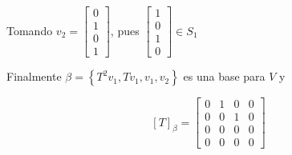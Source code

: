 \documentclass[10pt,a4paper]{article}
\begin{document}
Tomando $v_{2} = 
\begin{bmatrix}
0\\
1\\
0\\
1
\end{bmatrix}$, pues 
$\begin{bmatrix}
1\\
0\\
1\\
0
\end{bmatrix}\in S_{1}$

Finalmente $\beta = \left\{T^{2}v_{1}, Tv_{1}, v_{1}, v_{2}\right\}$ es una base para $V$ y 

$$[T]_{\beta} = 
\begin{bmatrix}
	0	&	1	&	0	&	0\\
	0	&	0	&	1	&	0\\
	0	&	0	&	0	&	0\\
	0	&	0	&	0	&	0
\end{bmatrix}
$$
\end{document}

